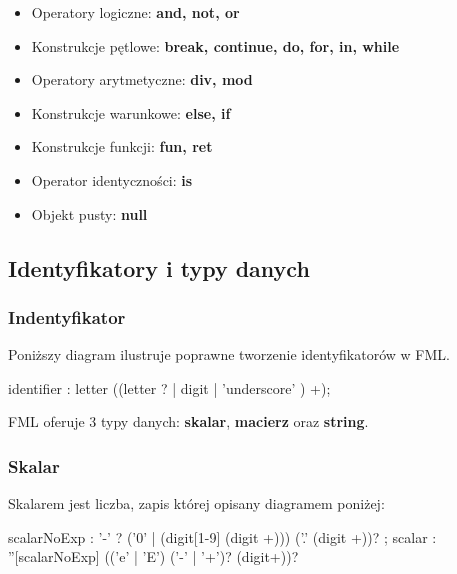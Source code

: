 \documentclass[12pt,a4paper]{article}
\begin{document}
\begin{itemize}
\item Operatory logiczne: \textbf{and, not, or}

\item Konstrukcje pętlowe: \textbf{break, continue, do, for, in, while}

\item Operatory arytmetyczne: \textbf{div, mod}

\item Konstrukcje warunkowe: \textbf{else, if}

\item Konstrukcje funkcji: \textbf{fun, ret}

\item Operator identyczności: \textbf{is}

\item Objekt pusty: \textbf{null}

\end{itemize}
\pagebreak

%
%
\subsection{Identyfikatory i typy danych}

\subsubsection{Indentyfikator}

Poniższy diagram ilustruje poprawne tworzenie identyfikatorów w FML.

%
%
\begin{rail}

identifier : letter ((letter ? | digit | 'underscore' ) +);
     
\end{rail}


FML oferuje 3 typy danych: \textbf{skalar}, \textbf{macierz} oraz \textbf{string}.

\subsubsection{Skalar}

Skalarem jest liczba, zapis której opisany diagramem poniżej:

\begin{rail}

scalarNoExp : '-' ? ('0' | (digit[1-9] (digit +))) ('.' (digit +))? ;
scalar : ''[scalarNoExp] (('e' | 'E') ('-' | '+')? (digit+))?

\end{rail}
\end{document}
